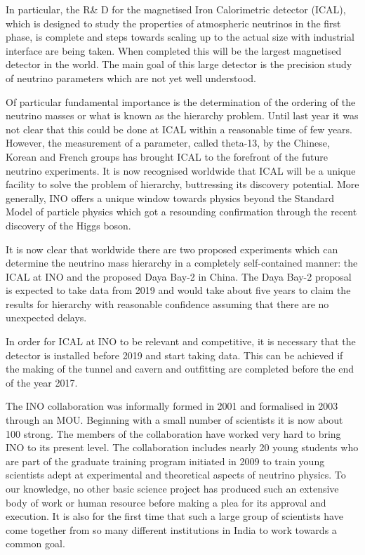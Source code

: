 In particular, the R\& D for the magnetised Iron Calorimetric detector
(ICAL), which is designed to study the properties of atmospheric neutrinos
in the first phase, is complete and steps towards scaling up to the
actual size with industrial interface are being taken. When completed
this will be the largest magnetised detector in the world. The main goal
of this large detector is the precision study of neutrino parameters
which are not yet well understood.

Of particular fundamental importance is the determination of the ordering
of the neutrino masses or what is known as the hierarchy problem. Until
last year it was not clear that this could be done at ICAL within a
reasonable time of few years. However, the measurement of a parameter,
called theta-13, by the Chinese, Korean and French groups has brought ICAL
to the forefront of the future neutrino experiments. It is now recognised
worldwide that ICAL will be a unique facility to solve the problem of
hierarchy, buttressing its discovery potential. More generally, INO offers
a unique window towards physics beyond the Standard Model of particle
physics which got a resounding confirmation through the recent discovery
of the Higgs boson.

It is now clear that worldwide there are two proposed experiments which
can determine the neutrino mass hierarchy in a completely self-contained
manner: the ICAL at INO and the proposed Daya Bay-2 in China. The Daya
Bay-2 proposal is expected to take data from 2019 and would take about
five years to claim the results for hierarchy with reasonable confidence
assuming that there are no unexpected delays.

In order for ICAL at INO to be relevant and competitive, it is necessary
that the detector is installed before 2019 and start taking data. This
can be achieved if the making of the tunnel and cavern and outfitting
are completed before the end of the year 2017.

The INO collaboration was informally formed in 2001 and formalised in 2003
through an MOU. Beginning with a small number of scientists it is now
about 100 strong. The members of the collaboration have worked very hard
to bring INO to its present level. The collaboration includes nearly 20
young students who are part of the graduate training program initiated in
2009 to train young scientists adept at experimental and theoretical
aspects of neutrino physics. To our knowledge, no other basic science
project has produced such an extensive body of work or human resource
before making a plea for its approval and execution. It is also
for the first time that such a large group of scientists have come
together from so many different institutions in India to work towards
a common goal.

